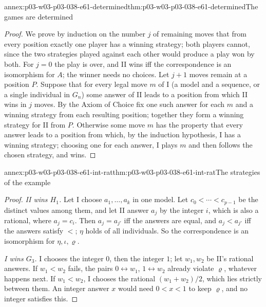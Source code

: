 \begin{annexitem}{annex:p03-w03-p03-038-e61-determined}{thm:p03-w03-p03-038-e61-determined}{The games are determined}
\begin{proof}
We prove by induction on the number \(j\) of remaining moves that from every
position exactly one player has a winning strategy; both players cannot,
since the two strategies played against each other would produce a play won
by both. For \(j=0\) the play is over, and II wins iff the correspondence is
an isomorphism for \(A\); the winner needs no choices. Let \(j+1\) moves
remain at a position \(P\). Suppose that for every legal move \(m\) of I
(a model and a sequence, or a single individual in \(G_n\)) some answer of
II leads to a position from which II wins in \(j\) moves. By the Axiom of
Choice fix one such answer for each \(m\) and a winning strategy from each
resulting position; together they form a winning strategy for II from
\(P\). Otherwise some move \(m\) has the property that every answer leads to
a position from which, by the induction hypothesis, I has a winning
strategy; choosing one for each answer, I plays \(m\) and then follows the
chosen strategy, and wins.
\end{proof}
\end{annexitem}

\begin{annexitem}{annex:p03-w03-p03-038-e61-int-rat}{thm:p03-w03-p03-038-e61-int-rat}{The strategies of the example}
\begin{proof}
\emph{II wins \(H_1\).} Let I choose \(a_1,\ldots,a_k\) in one model. Let
\(c_0<\cdots<c_{p-1}\) be the distinct values among them, and let II answer
\(a_j\) by the integer \(i\), which is also a rational, where \(a_j=c_i\).
Then \(a_j=a_{j'}\) iff the answers are equal, and \(a_j<a_{j'}\) iff the
answers satisfy \(<\); \(\eta\) holds of all individuals. So the
correspondence is an isomorphism for \(\eta,\iota,\varrho\).

\emph{I wins \(G_3\).} I chooses the integer \(0\), then the integer \(1\);
let \(w_1,w_2\) be II's rational answers. If \(w_1<w_2\) fails, the pairs
\(0\leftrightarrow w_1\), \(1\leftrightarrow w_2\) already violate
\(\varrho\), whatever happens next. If \(w_1<w_2\), I chooses the rational
\((w_1+w_2)/2\), which lies strictly between them. An integer answer \(x\)
would need \(0<x<1\) to keep \(\varrho\), and no integer satisfies this.
\end{proof}
\end{annexitem}

